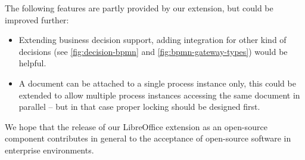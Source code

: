 The following features are partly provided by our extension, but could be
improved further:

\begin{itemize}
\item Extending business decision support, adding integration for other kind of
decisions (see \autoref{fig:decision-bpmn} and
\autoref{fig:bpmn-gateway-types}) would be helpful.
\item A document can be attached to a single process instance only, this could
be extended to allow multiple process instances accessing the same document in
parallel -- but in that case proper locking should be designed first.
\end{itemize}

We hope that the release of our LibreOffice extension as an open-source
component contributes in general to the acceptance of open-source software in
enterprise environments.
